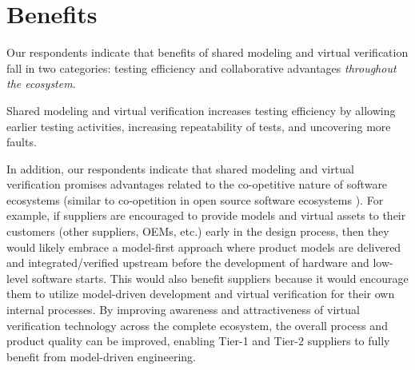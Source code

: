 \section{Benefits} \label{sec:benefits}
Our respondents indicate that %
benefits of shared modeling and virtual verification fall in two categories:
testing efficiency and collaborative advantages \emph{throughout the ecosystem}.

Shared modeling and virtual verification increases testing efficiency by allowing earlier testing activities, increasing repeatability of tests, and uncovering more faults. 


In addition, %
our respondents indicate that shared modeling and virtual verification promises advantages related to the co-opetitive nature of software ecosystems (similar to co-opetition in open source software ecosystems \cite{Agerfalk2008}).
%
%
For example, if suppliers are encouraged to provide models and virtual assets to their customers (other suppliers, OEMs, etc.) early in the design process, then they would likely embrace a model-first approach where product models are delivered and integrated/verified upstream before the development of hardware and low-level software starts.
This would also benefit suppliers because it would encourage them to utilize model-driven development and virtual verification for their own internal processes.
By improving awareness and attractiveness of virtual verification technology across the complete ecosystem, the overall process and product quality can be improved, enabling Tier-1 and Tier-2 suppliers to fully benefit from model-driven engineering.

